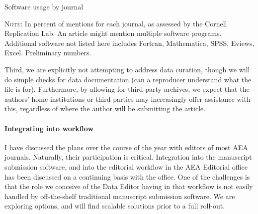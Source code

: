 \documentclass[PP]{AEA}
\begin{document}
\begin{table}
	\caption{Software usage by journal\label{tab:software_by_journal}} 
	\small
\begin{tablenotes}
\textsc{Note:} In percent of mentions for each journal, as assessed by the Cornell Replication Lab. An article might mention multiple software programs. Additional software not listed here includes Fortran, Mathematica, SPSS, Eviews, Excel. Preliminary numbers. 
\end{tablenotes}
\end{table}


Third, we are explicitly not attempting to address data curation, though we will do simple checks for data documentation (can a reproducer understand what the file is for). Furthermore,  by allowing for third-party archives, we expect that the authors' home institutions or third parties may increasingly offer assistance with this, regardless of where the author will be submitting the article. 

\FloatBarrier
\paragraph{Integrating into workflow} I have discussed the plans over the course of the year with editors of most AEA journals. Naturally, their participation is critical. Integration into the manuscript submission software, and into the editorial workflow in the AEA Editorial office has been discussed on a continuing basis with the office. One of the challenges is that the role we conceive of the Data Editor having in that workflow is not easily handled by off-the-shelf traditional manuscript submission software. We are exploring options, and will find scalable solutions prior to a full roll-out. 
\end{document}
